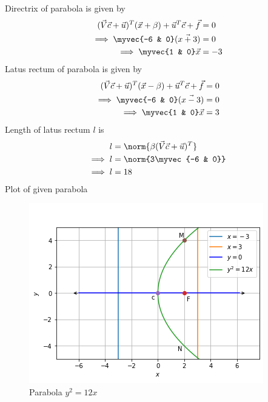 \documentclass[journal,12pt,twocolumn]{IEEEtran}
\begin{document}
Directrix of parabola is given by
\begin{align}
(\vec{V}\vec{c}+\vec{u})^T(\vec{x} +\beta) + \vec{u}^T\vec{c} + \vec{f} &= 0
\\
\implies \myvec{-6 & 0}(\vec{x+3}) &= 0
\\
\implies \myvec{1 & 0}\vec{x} &= -3
\end{align}
Latus rectum of parabola is given by
\begin{align}
(\vec{V}\vec{c}+\vec{u})^T(\vec{x} -\beta) + \vec{u}^T\vec{c} + \vec{f} &= 0
\\
\implies \myvec{-6 & 0}(\vec{x-3}) &= 0
\\
\implies \myvec{1 & 0}\vec{x} &=3
\end{align}
Length of latus rectum $l$ is 
\begin{align}
l &= \norm{\beta(\vec{V}\vec{c}+\vec{u})^T}
\\
\implies l &= \norm{3\myvec{-6 & 0}}
\\
\implies l &= 18 
\end{align}
Plot of given parabola
\begin{figure}[!ht]
\centering
\includegraphics[width=\columnwidth]{FIG-5.png}
\caption{Parabola $y^2=12x$ }
\label{fig:parabola}	
\end{figure}
\end{document}
